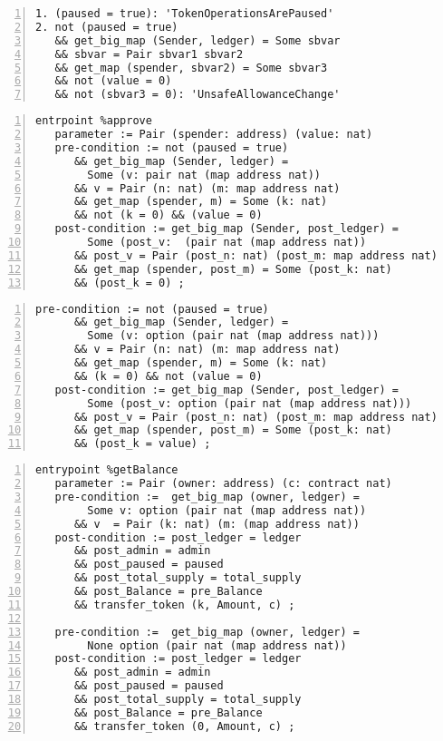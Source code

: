 \begin{lstlisting}[float=tp,captionpos=b,caption={Fail conditions for the \lstinline/approve/ entrypoint},label={lst:approve-udstz-contract},numbers=left]
1. (paused = true): 'TokenOperationsArePaused'
2. not (paused = true) 
   && get_big_map (Sender, ledger) = Some sbvar 
   && sbvar = Pair sbvar1 sbvar2 
   && get_map (spender, sbvar2) = Some sbvar3 
   && not (value = 0) 
   && not (sbvar3 = 0): 'UnsafeAllowanceChange'
\end{lstlisting}
\begin{lstlisting}[float=tp,captionpos=b,caption={Specification of the \lstinline/approve/ entrypoint (Property 1)},label={lst:specification-approve-1},numbers=left]
entrpoint %approve
   parameter := Pair (spender: address) (value: nat)
   pre-condition := not (paused = true)
      && get_big_map (Sender, ledger) = 
        Some (v: pair nat (map address nat))
      && v = Pair (n: nat) (m: map address nat) 
      && get_map (spender, m) = Some (k: nat) 
      && not (k = 0) && (value = 0)
   post-condition := get_big_map (Sender, post_ledger) = 
        Some (post_v:  (pair nat (map address nat))
      && post_v = Pair (post_n: nat) (post_m: map address nat) 
      && get_map (spender, post_m) = Some (post_k: nat) 
      && (post_k = 0) ;
\end{lstlisting}
\begin{lstlisting}[float=tp,captionpos=b,caption={Specification of the \lstinline/approve/ entrypoint (Property 2)},label={lst:specification-approve-2},numbers=left]
   pre-condition := not (paused = true) 
      && get_big_map (Sender, ledger) = 
        Some (v: option (pair nat (map address nat))) 
      && v = Pair (n: nat) (m: map address nat) 
      && get_map (spender, m) = Some (k: nat) 
      && (k = 0) && not (value = 0)
   post-condition := get_big_map (Sender, post_ledger) = 
        Some (post_v: option (pair nat (map address nat))) 
      && post_v = Pair (post_n: nat) (post_m: map address nat) 
      && get_map (spender, post_m) = Some (post_k: nat) 
      && (post_k = value) ;
\end{lstlisting}
\begin{lstlisting}[float=tp,captionpos=b,caption={Specification of the \lstinline/getBalance/ entrypoint},label={lst:specification-get-balance},numbers=left]
entrypoint %getBalance
   parameter := Pair (owner: address) (c: contract nat)
   pre-condition :=  get_big_map (owner, ledger) = 
        Some v: option (pair nat (map address nat)) 
      && v  = Pair (k: nat) (m: (map address nat))
   post-condition := post_ledger = ledger 
      && post_admin = admin 
      && post_paused = paused 
      && post_total_supply = total_supply 
      && post_Balance = pre_Balance 
      && transfer_token (k, Amount, c) ;

   pre-condition :=  get_big_map (owner, ledger) = 
        None option (pair nat (map address nat)) 
   post-condition := post_ledger = ledger 
      && post_admin = admin 
      && post_paused = paused 
      && post_total_supply = total_supply 
      && post_Balance = pre_Balance 
      && transfer_token (0, Amount, c) ;
\end{lstlisting}
